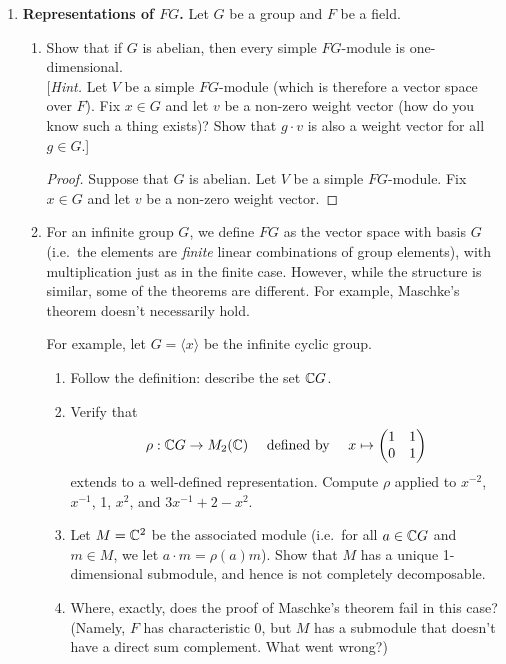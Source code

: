 \documentclass[11pt, reqno]{amsart}
\theoremstyle{plain}
\theoremstyle{definition}
\theoremstyle{example}
\def\<{\langle} \def\>{\rangle}
\def\Set{{\cS\mathrm{et}}}
\def\Set{{\cS\mathrm{et}}}
\def\Mod{{\cM\mathrm{od}}}
\begin{document}
\begin{enumerate}[1.]
\begin{enumerate}
\begin{proof}
as required.
\end{proof}

\item Let  $ \cG: \Mod_A \to \Set$ be the forgetful functor from $A$-modules to sets ($\cG$ sends a module to its underlying set, and sends an $A$-module homomorphism to the corresponding map of underlying sets). Reframe the universal property of free modules into a statement about an adjoint relationship between $\cF$ and $\cG$. 

\begin{proof}

\end{proof}

\end{enumerate}

\item \textbf{Representations of $FG$.}  Let $G$ be a group and $F$ be a field.

\begin{enumerate}
\item Show that if $G$ is abelian, then every simple $FG$-module is one-dimensional.\\
{[\emph{Hint.} Let $V$ be a simple $FG$-module (which is therefore a vector space over $F$). Fix $x \in G$ and let $v$ be a non-zero weight vector (how do you know such a thing exists)? Show that $g\cdot v$ is also a weight vector for all $g \in G$.]}
\begin{proof}
Suppose that $G$ is abelian. Let $V$ be a simple $FG$-module. Fix $x \in G$ and let $v$ be a non-zero weight vector.
\end{proof}
\item For an infinite group $G$, we define $FG$ as the vector space with basis $G$ (i.e.\ the elements are \emph{finite} linear combinations of group elements), with multiplication just as in the finite case. However, while the structure is similar, some of the theorems are different. For example, Maschke's theorem doesn't necessarily hold.

For example, let $G = \<x\>$ be the infinite cyclic group. 
\begin{enumerate}
\item Follow the definition: describe the set $\mathbb{C} G$. 
\item Verify that 
$$\rho: \mathbb{C} G \to M_2(\mathbb{C}) \quad \text{ defined by } \quad x \mapsto \begin{pmatrix}1 & 1 \\ 0 & 1 \end{pmatrix}$$
extends to a well-defined representation. Compute $\rho$ applied to $x^{-2}$, $x^{-1}$, 1, $x^2$, and $3x^{-1} + 2 - x^2$. 
\item Let $M = \mathbb{C}^2$ be the associated module (i.e.\ for all $a \in \mathbb{C} G$ and $m \in M$, we let  $a \cdot m = \rho(a)m$). Show that $M$ has a unique 1-dimensional submodule, and hence is not completely decomposable. 
\item Where, exactly, does the proof of Maschke's theorem fail in this case? (Namely, $F$ has characteristic 0, but $M$ has a submodule that doesn't have a direct sum complement. What went wrong?)


\end{enumerate}
\end{enumerate}
\end{enumerate}
\end{document}
